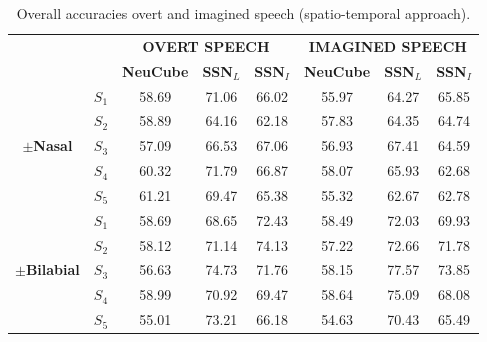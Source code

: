 \begin{table}[h!]
	\centering
	\caption{Overall accuracies overt and imagined speech (spatio-temporal approach).}
	\begin{tabular}{|*{8}{c|}}
		\cline{3-8}
		\multicolumn{2}{c|}{\multirow{2}{*}{}}&\multicolumn{3}{c|}{\textbf{OVERT SPEECH}}&\multicolumn{3}{c|}{\textbf{IMAGINED SPEECH}}\\\cline{3-8}
		\multicolumn{2}{c|}{}&\textbf{NeuCube}&\textbf{SSN}$_{L}$&\textbf{SSN}$_{I}$&\textbf{NeuCube}&\textbf{SSN}$_{L}$&\textbf{SSN}$_{I}$\\\hline
		\multirow{5}{*}{\begin{sideways}\textbf{$\pm$\textbf{Nasal}}\end{sideways}}&\boldmath$S_{1}$&58.69 & 71.06 & 66.02 & 55.97 & 64.27 & 65.85 \\\cline{2-8}
		&\boldmath$S_{2}$&58.89 & 64.16 & 62.18 & 57.83 & 64.35 & 64.74\\\cline{2-8}
		&\boldmath$S_{3}$&57.09 & 66.53 & 67.06 & 56.93 & 67.41 & 64.59\\\cline{2-8}
		&\boldmath$S_{4}$&60.32 & 71.79 & 66.87 & 58.07 & 65.93 & 62.68\\\cline{2-8}
		&\boldmath$S_{5}$&61.21 & 69.47 & 65.38 & 55.32 & 62.67 & 62.78\\\hline
		\multirow{5}{*}{\begin{sideways}\textbf{\boldmath$\pm$\textbf{Bilabial}}\end{sideways}}&\boldmath$S_{1}$&58.69 & \cellcolor{orange}68.65 & 72.43 & 58.49 & \cellcolor{orange}72.03 & 69.93\\\cline{2-8}
		&\boldmath$S_{2}$&58.12 & \cellcolor{orange}71.14 & 74.13 & 57.22 & \cellcolor{orange}72.66 & 71.78\\\cline{2-8}
		&\boldmath$S_{3}$&56.63 & \cellcolor{orange}74.73 & 71.76 & 58.15 & \cellcolor{orange}77.57 & 73.85\\\cline{2-8}
		&\boldmath$S_{4}$&58.99 & \cellcolor{orange}70.92 & 69.47 & 58.64 & \cellcolor{orange}75.09 & 68.08\\\cline{2-8}
		&\boldmath$S_{5}$&55.01 & \cellcolor{orange}73.21 & 66.18 & 54.63 & \cellcolor{orange}70.43 & 65.49\\\hline
		\end{tabular}%
		\label{Table: Classification_ST}
\end{table}%

